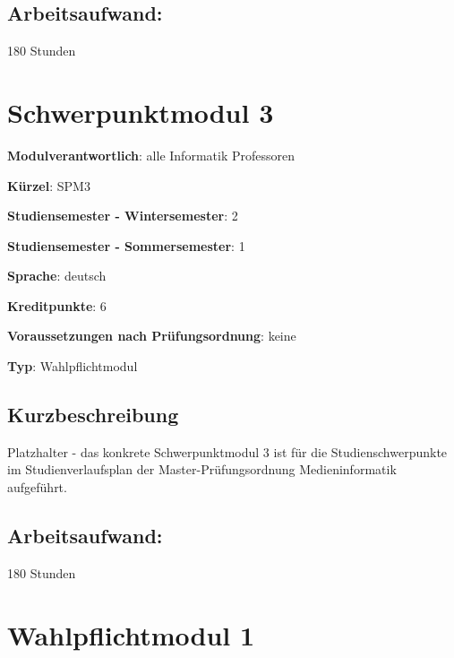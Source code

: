 \section*{Arbeitsaufwand:}\label{arbeitsaufwand-4}

180 Stunden

\chapter{Schwerpunktmodul 3}\label{schwerpunktmodul-3}

\begin{modulHead}
\textbf{Modulverantwortlich}: alle Informatik
Professoren
\end{modulHead}
\begin{modulHead}
\textbf{Kürzel}:
SPM3
\end{modulHead}
\begin{modulHead}
\textbf{Studiensemester -
Wintersemester}:
2
\end{modulHead}
\begin{modulHead}
\textbf{Studiensemester -
Sommersemester}: 1
\end{modulHead}
\begin{modulHead}
\textbf{Sprache}:
deutsch
\end{modulHead}
\begin{modulHead}
\textbf{Kreditpunkte}:
6
\end{modulHead}
\begin{modulHead}
\textbf{Voraussetzungen nach
Prüfungsordnung}: keine
\end{modulHead}
\begin{modulHead}
\textbf{Typ}:
Wahlpflichtmodul
\end{modulHead}


\section*{Kurzbeschreibung}\label{kurzbeschreibung-3}

Platzhalter - das konkrete Schwerpunktmodul 3 ist für die
Studienschwerpunkte im Studienverlaufsplan der Master-Prüfungsordnung
Medieninformatik aufgeführt.

\section*{Arbeitsaufwand:}\label{arbeitsaufwand-5}

180 Stunden

\chapter{Wahlpflichtmodul 1}\label{wahlpflichtmodul-1}

